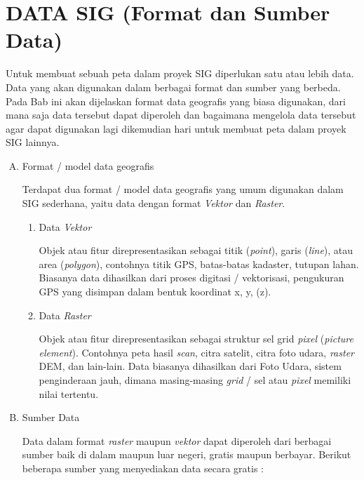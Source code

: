 \chapter{DATA SIG (Format dan Sumber Data)}

Untuk membuat sebuah peta dalam proyek SIG diperlukan satu atau lebih data. Data yang akan digunakan dalam berbagai format dan sumber yang berbeda. Pada Bab ini akan dijelaskan format data geografis yang biasa digunakan, dari mana saja data tersebut dapat diperoleh dan bagaimana mengelola data tersebut agar dapat digunakan lagi dikemudian hari untuk membuat peta dalam proyek SIG lainnya.

\begin{enumerate}[A.]

\item Format / model data geografis

Terdapat dua format / model data geografis yang umum digunakan dalam SIG sederhana, yaitu data dengan format \textit{Vektor} dan \textit{Raster}.

\begin{enumerate}[1.]

\item Data \textit{Vektor}

Objek atau fitur direpresentasikan sebagai titik (\textit{point}), garis (\textit{line}), atau area (\textit{polygon}), contohnya titik GPS, batas-batas kadaster, tutupan lahan. Biasanya data dihasilkan dari proses digitasi / vektorisasi, pengukuran GPS yang disimpan dalam bentuk koordinat x, y, (z). 

\item Data \textit{Raster}

Objek atau fitur direpresentasikan sebagai struktur sel grid \textit{pixel} (\textit{picture element}). Contohnya peta hasil \textit{scan}, citra satelit, citra foto udara, \textit{raster} DEM, dan lain-lain. Data biasanya dihasilkan dari Foto Udara, sistem penginderaan jauh, dimana masing-masing \textit{grid} / sel atau \textit{pixel} memiliki nilai tertentu.

\end{enumerate}

\item Sumber Data

Data dalam format \textit{raster} maupun \textit{vektor} dapat diperoleh dari berbagai sumber baik di dalam maupun luar negeri, gratis maupun berbayar. Berikut beberapa sumber yang menyediakan data secara gratis :


\end{enumerate}
